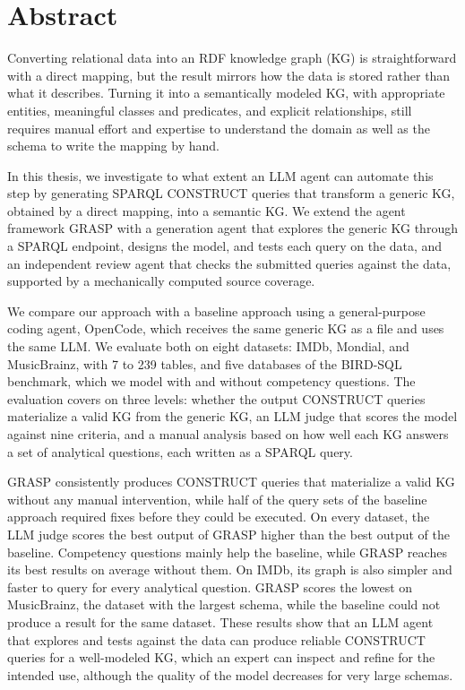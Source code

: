 \section*{Abstract}

Converting relational data into an RDF knowledge graph (KG) is straightforward with a direct mapping, but the result mirrors how the data is stored rather than what it describes. Turning it into a semantically modeled KG, with appropriate entities, meaningful classes and predicates, and explicit relationships, still requires manual effort and expertise to understand the domain as well as the schema to write the mapping by hand.

In this thesis, we investigate to what extent an LLM agent can automate this step by generating SPARQL CONSTRUCT queries that transform a generic KG, obtained by a direct mapping, into a semantic KG\@. We extend the agent framework GRASP with a generation agent that explores the generic KG through a SPARQL endpoint, designs the model, and tests each query on the data, and an independent review agent that checks the submitted queries against the data, supported by a mechanically computed source coverage. 

We compare our approach with a baseline approach using a general-purpose coding agent, OpenCode, which receives the same generic KG as a file and uses the same LLM\@. We evaluate both on eight datasets: IMDb, Mondial, and MusicBrainz, with 7 to 239 tables, and five databases of the BIRD-SQL benchmark, which we model with and without competency questions. The evaluation covers on three levels: whether the output CONSTRUCT queries materialize a valid KG from the generic KG, an LLM judge that scores the model against nine criteria, and a manual analysis based on how well each KG answers a set of analytical questions, each written as a SPARQL query.

GRASP consistently produces CONSTRUCT queries that materialize a valid KG without any manual intervention, while half of the query sets of the baseline approach required fixes before they could be executed. On every dataset, the LLM judge scores the best output of GRASP higher than the best output of the baseline. Competency questions mainly help the baseline, while GRASP reaches its best results on average without them. On IMDb, its graph is also simpler and faster to query for every analytical question. GRASP scores the lowest on MusicBrainz, the dataset with the largest schema, while the baseline could not produce a result for the same dataset. These results show that an LLM agent that explores and tests against the data can produce reliable CONSTRUCT queries for a well-modeled KG, which an expert can inspect and refine for the intended use, although the quality of the model decreases for very large schemas.
